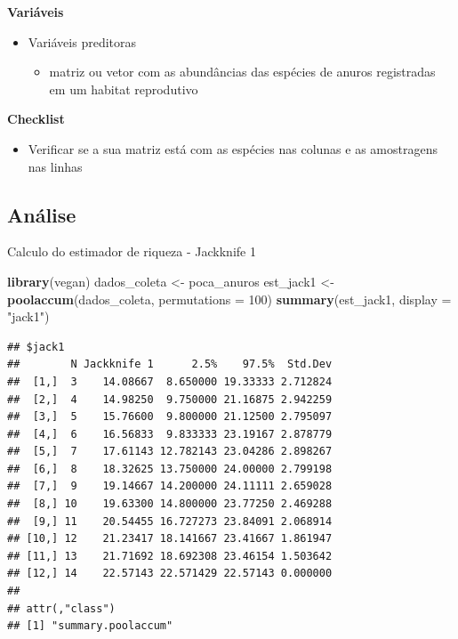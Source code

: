 \documentclass[
]{book}
\newenvironment{Shaded}{\begin{snugshade}}{\end{snugshade}}
\newcommand{\DataTypeTok}[1]{\textcolor[rgb]{0.13,0.29,0.53}{#1}}
\newcommand{\DecValTok}[1]{\textcolor[rgb]{0.00,0.00,0.81}{#1}}
\newcommand{\KeywordTok}[1]{\textcolor[rgb]{0.13,0.29,0.53}{\textbf{#1}}}
\newcommand{\NormalTok}[1]{#1}
\newcommand{\StringTok}[1]{\textcolor[rgb]{0.31,0.60,0.02}{#1}}
\providecommand{\tightlist}{%
  \setlength{\itemsep}{0pt}\setlength{\parskip}{0pt}}
\begin{document}
\textbf{Variáveis}

\begin{itemize}
\tightlist
\item
  Variáveis preditoras

  \begin{itemize}
  \tightlist
  \item
    matriz ou vetor com as abundâncias das espécies de anuros registradas em um habitat reprodutivo
  \end{itemize}
\end{itemize}

\textbf{Checklist}

\begin{itemize}
\tightlist
\item
  Verificar se a sua matriz está com as espécies nas colunas e as amostragens nas linhas
\end{itemize}

\hypertarget{anuxe1lise-3}{%
\subsection{Análise}\label{anuxe1lise-3}}

Calculo do estimador de riqueza - Jackknife 1

\begin{Shaded}
\begin{Highlighting}[]
\KeywordTok{library}\NormalTok{(vegan)}
\NormalTok{dados_coleta <-}\StringTok{ }\NormalTok{poca_anuros}
\NormalTok{est_jack1 <-}\StringTok{ }\KeywordTok{poolaccum}\NormalTok{(dados_coleta, }\DataTypeTok{permutations =} \DecValTok{100}\NormalTok{)}
\KeywordTok{summary}\NormalTok{(est_jack1, }\DataTypeTok{display =} \StringTok{"jack1"}\NormalTok{)}
\end{Highlighting}
\end{Shaded}

\begin{verbatim}
## $jack1
##        N Jackknife 1      2.5%    97.5%  Std.Dev
##  [1,]  3    14.08667  8.650000 19.33333 2.712824
##  [2,]  4    14.98250  9.750000 21.16875 2.942259
##  [3,]  5    15.76600  9.800000 21.12500 2.795097
##  [4,]  6    16.56833  9.833333 23.19167 2.878779
##  [5,]  7    17.61143 12.782143 23.04286 2.898267
##  [6,]  8    18.32625 13.750000 24.00000 2.799198
##  [7,]  9    19.14667 14.200000 24.11111 2.659028
##  [8,] 10    19.63300 14.800000 23.77250 2.469288
##  [9,] 11    20.54455 16.727273 23.84091 2.068914
## [10,] 12    21.23417 18.141667 23.41667 1.861947
## [11,] 13    21.71692 18.692308 23.46154 1.503642
## [12,] 14    22.57143 22.571429 22.57143 0.000000
## 
## attr(,"class")
## [1] "summary.poolaccum"
\end{verbatim}
\end{document}
